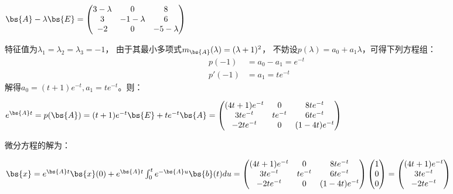 \documentclass[12pt, a4paper, oneside]{ctexbook}
\begin{document}
\section{}
$\bs{A}-\lambda\bs{E}=\begin{pmatrix}
3-\lambda& 0& 8 \\
3& -1-\lambda& 6 \\
-2& 0 &-5-\lambda
\end{pmatrix}$

特征值为$\lambda_1=\lambda_2=\lambda_3=-1$，
由于其最小多项式$m_{\bs{A}}(\lambda)=(\lambda+1)^2$，
不妨设$p(\lambda)=a_0+a_1\lambda$，可得下列方程组：
\begin{align*}
p(-1)&=a_0-a_1=e^{-t} \\
p'(-1)&=a_1=te^{-t}
\end{align*}
解得$a_0=(t+1)e^{-t},a_1=te^{-t}$。则：

$e^{\bs{A}t}=p(\bs{A})=
(t+1)e^{-t}\bs{E}+te^{-t}\bs{A}=\begin{pmatrix}
    (4t+1)e^{-t} & 0 & 8te^{-t} \\
    3te^{-t} & te^{-t} & 6te^{-t} \\
    -2te^{-t}& 0 &(1-4t)e^{-t}
\end{pmatrix}    $

微分方程的解为：

$\bs{x}=e^{\bs{A}t}\bs{x}(0)+e^{\bs{A}t} \int_{0}^t e^{-\bs{A}u}\bs{b}(t)du
=\begin{pmatrix}
    (4t+1)e^{-t} & 0 & 8te^{-t} \\
    3te^{-t} & te^{-t} & 6te^{-t} \\
    -2te^{-t}& 0 &(1-4t)e^{-t}
\end{pmatrix} \begin{pmatrix}
    1 \\
    0\\
    0
\end{pmatrix}=
\begin{pmatrix}
    (4t+1)e^{-t}  \\
    3te^{-t}  \\
    -2te^{-t}
\end{pmatrix}$
\end{document}

